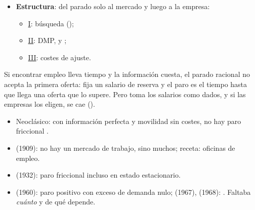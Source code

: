 \documentclass{article}
\begin{document}
\begin{columnas}
\begin{itemize}
\begin{itemize}
  \item ¿Es voluntario el parado que rechaza ofertas? ¿Es eficiente el paro de equilibrio?
  \item ¿Cómo ajustan las empresas la plantilla si contratar y despedir cuesta?
  \end{itemize}
\item \textbf{Estructura}: del parado solo al mercado y luego a la empresa:
  \begin{itemize}
  \item \hyperref[rep:I]{I}: búsqueda ();
  \item \hyperref[rep:II]{II}: DMP,  y ;
  \item \hyperref[rep:III]{III}: costes de ajuste.
  \end{itemize}
\end{itemize}

\begin{ideaclave}
Si encontrar empleo lleva tiempo y la información cuesta, el parado racional no acepta la primera oferta: fija un salario de reserva y el paro es el tiempo hasta que llega una oferta que lo supere. Pero toma los salarios como dados, y si las empresas los eligen, se cae ().
\end{ideaclave}

\begin{itemize}
\item Neoclásico: con información perfecta y movilidad sin costes, no hay paro friccional .
\item {} (1909): no hay un mercado de trabajo, sino muchos; receta: oficinas de empleo.
\item {} (1932): paro friccional incluso en estado estacionario.
\item {} (1960): paro positivo con exceso de demanda nulo;  (1967),  (1968):   . Faltaba \emph{cuánto} y de qué depende.
\end{itemize}


\end{columnas}
\end{document}
